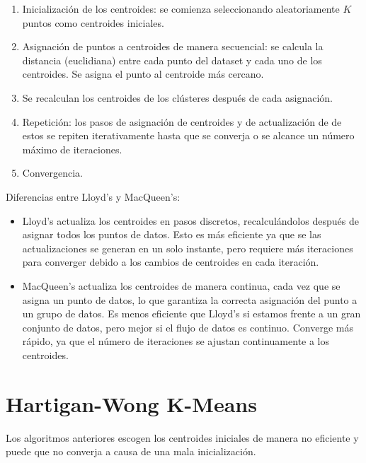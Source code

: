 \begin{enumerate}
    \item Inicialización de los centroides: se comienza seleccionando aleatoriamente $K$ puntos como centroides iniciales.

    \item Asignación de puntos a centroides de manera secuencial: se calcula la distancia (euclidiana) entre cada punto del dataset y cada uno de los centroides. Se asigna el punto al centroide más cercano.

    \item Se recalculan los centroides de los clústeres después de cada asignación.

    \item Repetición: los pasos de asignación de centroides y de actualización de de estos se repiten iterativamente hasta que se converja o se alcance un número máximo de iteraciones.

    \item Convergencia.
\end{enumerate}

Diferencias entre Lloyd's y MacQueen's:

\begin{itemize}
    \item Lloyd's actualiza los centroides en pasos discretos, recalculándolos después de asignar todos los puntos de datos. Esto es más eficiente ya que se las actualizaciones se generan en un solo instante, pero requiere más iteraciones para converger debido a los cambios de centroides en cada iteración.

    \item MacQueen's actualiza los centroides de manera continua, cada vez que se asigna un punto de datos, lo que garantiza la correcta asignación del punto a un grupo de datos. Es menos eficiente que Lloyd's si estamos frente a un gran conjunto de datos, pero mejor si el flujo de datos es continuo. Converge más rápido, ya que el número de iteraciones se ajustan continuamente a los centroides.
\end{itemize}



\section{Hartigan-Wong K-Means}
Los algoritmos anteriores escogen los centroides iniciales de manera no eficiente y puede que no converja a causa de una mala inicialización.

